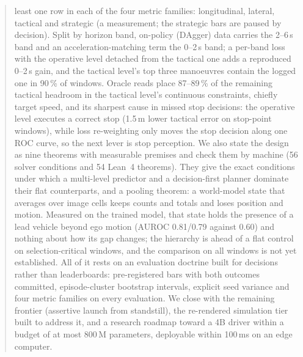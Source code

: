 \documentclass[10pt,twocolumn]{article}
\theoremstyle{remark}
\begin{document}
\begin{abstract}
least one row in each of the four metric families: longitudinal, lateral, tactical and strategic (a measurement; the strategic bars are paused by decision). Split by horizon band, on-policy (DAgger) data carries the 2--6\,s band and an acceleration-matching term the 0--2\,s band; a per-band loss with the operative level detached from the tactical one adds a reproduced 0--2\,s gain, and the tactical level's top three manoeuvres contain the logged one in 90\,\% of windows. Oracle reads place 87--89\,\% of the remaining tactical headroom in the tactical level's continuous constraints, chiefly target speed, and its sharpest cause in missed stop decisions: the operative level executes a correct stop (1.5\,m lower tactical error on stop-point windows), while loss re-weighting only moves the stop decision along one ROC curve, so the next lever is stop perception. We also state the design as nine theorems with measurable premises and check them by machine (56 solver conditions and 54 Lean~4 theorems). They give the exact conditions under which a multi-level predictor and a decision-first planner dominate their flat counterparts, and a pooling theorem: a world-model state that averages over image cells keeps counts and totals and loses position and motion. Measured on the trained model, that state holds the presence of a lead vehicle beyond ego motion (AUROC 0.81/0.79 against 0.60) and nothing about how its gap changes; the hierarchy is ahead of a flat control on selection-critical windows, and the comparison on all windows is not yet established. All of it rests on an evaluation
doctrine built for decisions rather than leaderboards: pre-registered bars with both outcomes committed, episode-cluster bootstrap
intervals, explicit seed variance and four metric families on every evaluation. We close with the remaining frontier (assertive
launch from standstill), the re-rendered simulation tier built to address it, and a research roadmap toward a 4B driver within a
budget of at most 800\,M parameters, deployable within 100\,ms on an edge computer.
\end{abstract}

\end{document}
